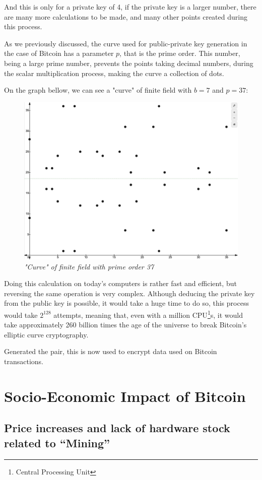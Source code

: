 \documentclass{article}
\begin{document}
And this is only for a private key of 4, if the private key is a larger number, there are many more calculations to be made, and many other points created during this process. 

As we previously discussed, the curve used for public-private key generation in the case of Bitcoin has a parameter \(p\), that is the prime order. This number, being a large prime number, prevents the points taking decimal numbers, during the scalar multiplication process, making the curve a collection of dots.

On the graph bellow, we can see a "curve" of finite field with \(b = 7\) and \(p = 37\):

\begin{figure}[H]
    \begin{center}
        \includegraphics[width=0.6 \textwidth]{images/finite_field_b7_p37.png}
        \caption{\textit{"Curve" of finite field with prime order 37}}
    \end{center}
\end{figure}

Doing this calculation on today's computers is rather fast and efficient, but reversing the same operation is very complex. Although deducing the private key from the public key is possible, it would take a huge time to do so, this process would take \(2^{128}\) attempts, meaning that, even with a million CPU\footnote{Central Processing Unit}s, it would take approximately 260 billion times the age of the universe to break Bitcoin's elliptic curve cryptography.

Generated the pair, this is now used to encrypt data used on Bitcoin transactions.

\section{Socio-Economic Impact of Bitcoin}

\subsection{Price increases and lack of hardware stock related to “Mining”}
\end{document}
